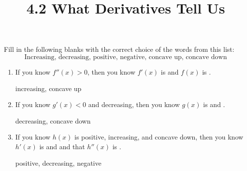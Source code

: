 \documentclass[nooutcomes]{ximera}
\title{4.2 What Derivatives Tell Us}
\begin{document}
\begin{abstract}		\end{abstract}
\maketitle

\begin{problem}
Fill in the following blanks with the correct choice of the words from this list:
$$ \text{Increasing, decreasing, positive, negative, concave up, concave down} $$

	\begin{enumerate}
	
	\item  If you know $f''(x) > 0$, then you know $f'(x)$ is \underline{\hspace{3cm}} and $f(x)$ is \underline{\hspace{3cm}}.
		\begin{freeResponse}
		increasing, concave up
		\end{freeResponse}
		
			
				
	\item  If you know $g'(x) < 0$ and decreasing, then you know $g(x)$ is \underline{\hspace{3cm}} and \underline{\hspace{3cm}}.
		\begin{freeResponse}
		decreasing, concave down
		\end{freeResponse}
		
			
				
	\item  If you know $h(x)$ is positive, increasing, and concave down, then you know $h'(x)$ is \underline{\hspace{3cm}} and \underline{\hspace{3cm}} and that $h''(x)$ is \underline{\hspace{3cm}}.
		\begin{freeResponse}
		positive, decreasing, negative
		\end{freeResponse}
		
			
				
	\end{enumerate}	
		
\end{problem}
		
\end{document}
